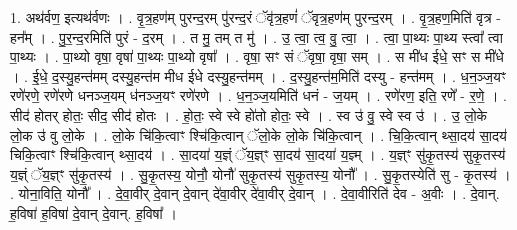 \documentclass[17pt]{extarticle}
\begin{document}
1. अथ॑र्वण॒ इत्यथ॑र्वणः । . वृ॒त्र॒हण॑म् पुरन्द॒रम् पु॑रन्द॒रं ॅवृ॑त्र॒हणं॑ ॅवृत्र॒हण॑म् पुरन्द॒रम् । . वृ॒त्र॒हण॒मिति॑ वृत्र - हन᳚म् । . पु॒र॒न्द॒रमिति॑ पुरं - द॒रम् । . त मु॒ तम् त मु॑ । . उ॒ त्वा॒ त्व॒ वु॒ त्वा॒ । . त्वा॒ पा॒थ्यः पा॒थ्य स्त्वा᳚ त्वा पा॒थ्यः । . पा॒थ्यो वृषा॒ वृषा॑ पा॒थ्यः पा॒थ्यो वृषा᳚ । . वृषा॒ सꣳ सं ॅवृषा॒ वृषा॒ सम् । . स मी॑ध ईधे॒ सꣳ स मी॑धे । . ई॒धे॒ द॒स्यु॒हन्त॑मम् दस्यु॒हन्त॑म मीध ईधे दस्यु॒हन्त॑मम् । . द॒स्यु॒हन्त॑म॒मिति॑ दस्यु - हन्त॑मम् । . ध॒न॒ञ्ज॒यꣳ रणे॑रणे॒ रणे॑रणे धनञ्ज॒यम् ध॑नञ्ज॒यꣳ रणे॑रणे । . ध॒न॒ञ्ज॒यमिति॑ धनं - ज॒यम् । . रणे॑रण॒ इति॒ रणे᳚ - र॒णे॒ । . सीद॑ होतर् होतः॒ सीद॒ सीद॑ होतः । . हो॒तः॒ स्वे स्वे हो॑तो होतः॒ स्वे । . स्व उ॑ वु॒ स्वे स्व उ॑ । . उ॒ लो॒के लो॒क उ॑ वु लो॒के । . लो॒के चि॑कि॒त्वाꣳ श्चि॑कि॒त्वान् ॅलो॒के लो॒के चि॑कि॒त्वान् । . चि॒कि॒त्वान् थ्सा॒दय॑ सा॒दय॑ चिकि॒त्वाꣳ श्चि॑कि॒त्वान् थ्सा॒दय॑ । . सा॒दया॑ य॒ज्ञ्ं ॅय॒ज्ञ्ꣳ सा॒दय॑ सा॒दया॑ य॒ज्ञ्म् । . य॒ज्ञ्ꣳ सु॑कृ॒तस्य॑ सुकृ॒तस्य॑ य॒ज्ञ्ं ॅय॒ज्ञ्ꣳ सु॑कृ॒तस्य॑ । . सु॒कृ॒तस्य॒ योनौ॒ योनौ॑ सुकृ॒तस्य॑ सुकृ॒तस्य॒ योनौ᳚ । . सु॒कृ॒तस्येति॑ सु - कृ॒तस्य॑ । . योना॒विति॒ योनौ᳚ । . दे॒वा॒वीर् दे॒वान् दे॒वान् दे॑वा॒वीर् दे॑वा॒वीर् दे॒वान् । . दे॒वा॒वीरिति॑ देव - अ॒वीः । . दे॒वान्. ह॒विषा॑ ह॒विषा॑ दे॒वान् दे॒वान्. ह॒विषा᳚ । \newline
\end{document}
